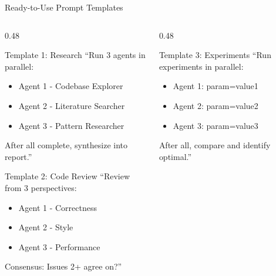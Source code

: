 \documentclass[aspectratio=169,11pt]{beamer}
\begin{document}
\begin{frame}{Ready-to-Use Prompt Templates}
    \begin{columns}[T]
        \begin{column}{0.48\textwidth}
            \begin{block}{Template 1: Research}
                \scriptsize
                ``Run 3 agents in parallel:
                \begin{itemize}
                    \item Agent 1 - Codebase Explorer
                    \item Agent 2 - Literature Searcher
                    \item Agent 3 - Pattern Researcher
                \end{itemize}
                After all complete, synthesize into report.''
            \end{block}

            \begin{block}{Template 2: Code Review}
                \scriptsize
                ``Review from 3 perspectives:
                \begin{itemize}
                    \item Agent 1 - Correctness
                    \item Agent 2 - Style
                    \item Agent 3 - Performance
                \end{itemize}
                Consensus: Issues 2+ agree on?''
            \end{block}
        \end{column}
        \begin{column}{0.48\textwidth}
            \begin{block}{Template 3: Experiments}
                \scriptsize
                ``Run experiments in parallel:
                \begin{itemize}
                    \item Agent 1: param=value1
                    \item Agent 2: param=value2
                    \item Agent 3: param=value3
                \end{itemize}
                After all, compare and identify optimal.''
            \end{block}


\end{column}
\end{columns}
\end{frame}
\end{document}
